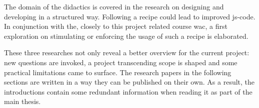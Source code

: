 The domain of the didactics is covered in the research on designing and developing
in a structured way. Following a recipe could lead to improved \gls{js-code}. In
conjunction with the, closely to this project related course \gls{wac}, a first
exploration on stimulating or enforcing the usage of such a recipe is elaborated.

These three researches not only reveal a better overview for the current project:
new questions are invoked, a project transcending scope is shaped and some practical
limitations came to surface. The research papers in the following sections are
written in a way they can be published on their own. As a result, the introductions
contain some redundant information when reading it as part of the main thesis.
